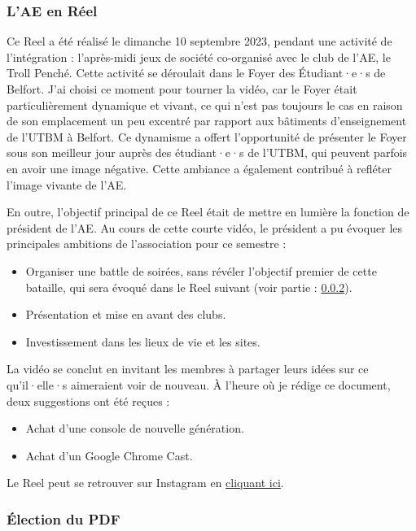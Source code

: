 \subsubsection{L'\gls{AE} en Réel}\label{subsubsec:ae-en-reel}

Ce Reel a été réalisé le dimanche 10 septembre 2023, pendant une activité de l'intégration : l'après-midi jeux de société co-organisé avec le club de l'\gls{AE}, le Troll Penché.
Cette activité se déroulait dans le Foyer des Étudiant·e·s de Belfort.
J'ai choisi ce moment pour tourner la vidéo, car le Foyer était particulièrement dynamique et vivant, ce qui n'est pas toujours le cas en raison de son emplacement un peu excentré par rapport aux bâtiments d'enseignement de l'\gls{UTBM} à Belfort.
Ce dynamisme a offert l'opportunité de présenter le Foyer sous son meilleur jour auprès des étudiant·e·s de l'\gls{UTBM}, qui peuvent parfois en avoir une image négative.
Cette ambiance a également contribué à refléter l'image vivante de l'\gls{AE}.

En outre, l'objectif principal de ce Reel était de mettre en lumière la fonction de président de l'\gls{AE}.
Au cours de cette courte vidéo, le président a pu évoquer les principales ambitions de l'association pour ce semestre :
\begin{itemize}
    \item Organiser une battle de soirées, sans révéler l'objectif premier de cette bataille, qui sera évoqué dans le Reel suivant (voir partie : \ref{subsubsec:election-pdf}).
    \item Présentation et mise en avant des clubs.
    \item Investissement dans les lieux de vie et les sites.
\end{itemize}

La vidéo se conclut en invitant les membres à partager leurs idées sur ce qu'il·elle·s aimeraient voir de nouveau.
À l'heure où je rédige ce document, deux suggestions ont été reçues :
\begin{itemize}
    \item Achat d'une console de nouvelle génération.
    \item Achat d'un Google Chrome Cast.
\end{itemize}

Le Reel peut se retrouver sur Instagram en \href{https://www.instagram.com/reel/CxGShAusxDq/?utm_source=ig_web_copy_link&igshid=MzRlODBiNWFlZA==}{cliquant ici}.


\subsubsection{Élection du \gls{PDF}}\label{subsubsec:election-pdf}


